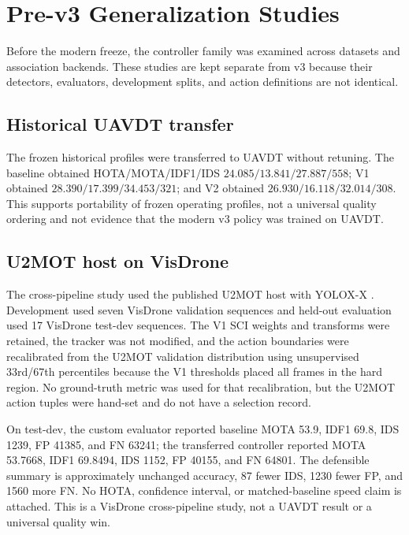 \section{Pre-v3 Generalization Studies}
Before the modern freeze, the controller family was examined across datasets
and association backends. These studies are kept separate from v3 because
their detectors, evaluators, development splits, and action definitions are
not identical.

\subsection{Historical UAVDT transfer}
The frozen historical profiles were transferred to UAVDT without retuning. The
baseline obtained HOTA/MOTA/IDF1/IDS $24.085/13.841/27.887/558$; V1 obtained
$28.390/17.399/34.453/321$; and V2 obtained $26.930/16.118/32.014/308$.
This supports portability of frozen operating profiles, not a universal
quality ordering and not evidence that the modern v3 policy was trained on
UAVDT.

\subsection{U2MOT host on VisDrone}
The cross-pipeline study used the published U2MOT host with YOLOX-X
\cite{liu2023u2mot,ge2021yolox}. Development used seven VisDrone validation
sequences and held-out evaluation used 17 VisDrone test-dev sequences. The
V1 SCI weights and transforms were retained, the tracker was not modified,
and the action boundaries were recalibrated from the U2MOT validation
distribution using unsupervised 33rd/67th percentiles because the V1
thresholds placed all frames in the hard region. No ground-truth metric was
used for that recalibration, but the U2MOT action tuples were hand-set and do
not have a selection record.

On test-dev, the custom evaluator reported baseline MOTA 53.9, IDF1 69.8,
IDS 1239, FP 41385, and FN 63241; the transferred controller reported MOTA
53.7668, IDF1 69.8494, IDS 1152, FP 40155, and FN 64801. The defensible
summary is approximately unchanged accuracy, 87 fewer IDS, 1230 fewer FP, and
1560 more FN. No HOTA, confidence interval, or matched-baseline speed claim
is attached. This is a VisDrone cross-pipeline study, not a UAVDT result or a
universal quality win.

